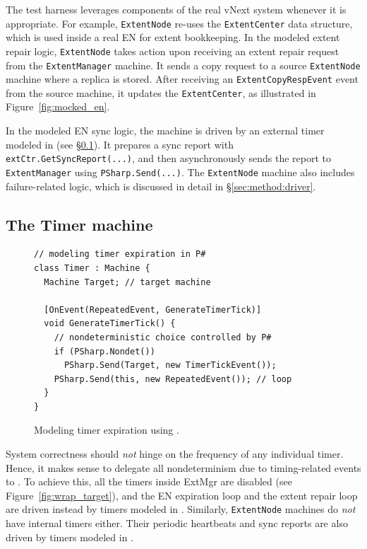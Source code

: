 The \psharp test harness leverages components of the real vNext system whenever it is appropriate. For example, \texttt{ExtentNode} re-uses the \texttt{ExtentCenter} data structure, which is used inside a real EN for extent bookkeeping. In the modeled extent repair logic, \texttt{ExtentNode} takes action upon receiving an extent repair request from the \texttt{ExtentManager} machine. It sends a copy request to a source \texttt{ExtentNode} machine where a replica is stored. After receiving an \texttt{ExtentCopyRespEvent} event from the source machine, it updates the \texttt{ExtentCenter}, as illustrated in Figure~\ref{fig:mocked_en}. 

In the modeled EN sync logic, the machine is driven by an external timer modeled in \psharp (see \S\ref{sec:method:timer}). It prepares a sync report with \texttt{extCtr.GetSyncReport(...)}, and then asynchronously sends the report to \texttt{ExtentManager} using \texttt{PSharp.Send(...)}. The \texttt{ExtentNode} machine also includes failure-related logic, which is discussed in detail in \S\ref{sec:method:driver}.

\subsection{The Timer machine}
\label{sec:method:timer}

\begin{figure}[t]
\begin{lstlisting}
// modeling timer expiration in P#
class Timer : Machine {
  Machine Target; // target machine

  [OnEvent(RepeatedEvent, GenerateTimerTick)]
  void GenerateTimerTick() {
    // nondeterministic choice controlled by P#
    if (PSharp.Nondet())
      PSharp.Send(Target, new TimerTickEvent());
    PSharp.Send(this, new RepeatedEvent()); // loop
  }
}
\end{lstlisting}
\vspace{-4mm}
\caption{Modeling timer expiration using \psharp.}
\label{fig:mocked_timer}
\vspace{-2mm}
\end{figure}

System correctness should \emph{not} hinge on the frequency of any individual timer. Hence, it makes sense to delegate all nondeterminism due to timing-related events to \psharp. To achieve this, all the timers inside ExtMgr are disabled (see Figure~\ref{fig:wrap_target}), and the EN expiration loop and the extent repair loop are driven instead by timers modeled in \psharp.
Similarly, \texttt{ExtentNode} machines do {\em not} have internal timers either. Their periodic heartbeats and sync reports are also driven by timers modeled in \psharp.


